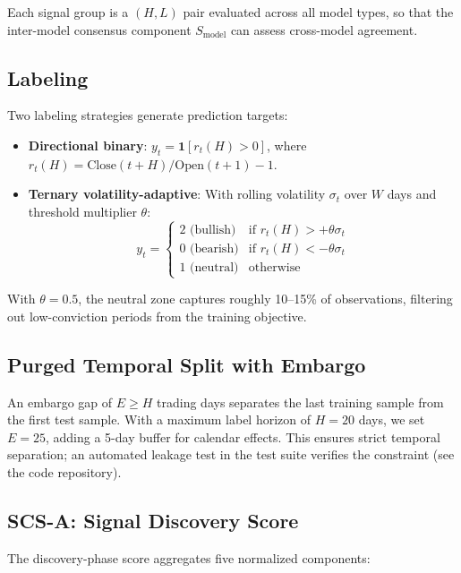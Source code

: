 \documentclass[12pt,a4paper]{article}
\begin{document}
Each signal group is a $(H, L)$ pair evaluated across all model types, so that the inter-model consensus component $S_{\text{model}}$ can assess cross-model agreement.

\subsection{Labeling}

Two labeling strategies generate prediction targets:

\begin{itemize}
  \item \textbf{Directional binary}: $y_t = \mathbf{1}[r_t(H) > 0]$, where $r_t(H) = \text{Close}(t+H)/\text{Open}(t+1) - 1$.
  \item \textbf{Ternary volatility-adaptive}: With rolling volatility $\sigma_t$ over $W$ days and threshold multiplier $\theta$:
    \begin{equation}
      y_t = \begin{cases}
        2 \text{ (bullish)} & \text{if } r_t(H) > +\theta\sigma_t \\
        0 \text{ (bearish)} & \text{if } r_t(H) < -\theta\sigma_t \\
        1 \text{ (neutral)} & \text{otherwise}
      \end{cases}
    \end{equation}
\end{itemize}

With $\theta=0.5$, the neutral zone captures roughly 10--15\% of observations, filtering out low-conviction periods from the training objective.

\subsection{Purged Temporal Split with Embargo}

An embargo gap of $E \geq H$ trading days separates the last training sample from the first test sample. With a maximum label horizon of $H=20$ days, we set $E=25$, adding a 5-day buffer for calendar effects. This ensures strict temporal separation; an automated leakage test in the test suite verifies the constraint (see the code repository).

\subsection{SCS-A: Signal Discovery Score}

The discovery-phase score aggregates five normalized components:
\end{document}
